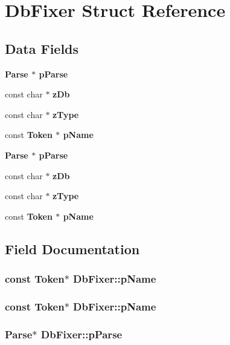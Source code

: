 \section{Db\-Fixer Struct Reference}
\label{structDbFixer}
\subsection*{Data Fields}
\begin{CompactItemize}
\item 
\bf{Parse} $\ast$ \bf{p\-Parse}
\item 
const char $\ast$ \bf{z\-Db}
\item 
const char $\ast$ \bf{z\-Type}
\item 
const \bf{Token} $\ast$ \bf{p\-Name}
\item 
\bf{Parse} $\ast$ \bf{p\-Parse}
\item 
const char $\ast$ \bf{z\-Db}
\item 
const char $\ast$ \bf{z\-Type}
\item 
const \bf{Token} $\ast$ \bf{p\-Name}
\end{CompactItemize}


\subsection{Field Documentation}
\subsubsection{\setlength{\rightskip}{0pt plus 5cm}const \bf{Token}$\ast$ \bf{Db\-Fixer::p\-Name}}\label{structDbFixer_ce2f1356abe1365e5657b75372edb2d1}


\subsubsection{\setlength{\rightskip}{0pt plus 5cm}const \bf{Token}$\ast$ \bf{Db\-Fixer::p\-Name}}\label{structDbFixer_ce2f1356abe1365e5657b75372edb2d1}


\subsubsection{\setlength{\rightskip}{0pt plus 5cm}\bf{Parse}$\ast$ \bf{Db\-Fixer::p\-Parse}}\label{structDbFixer_71ccbd9cf9da902ed22694f7fcac2405}


